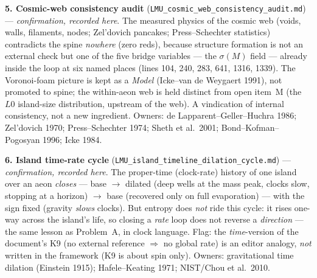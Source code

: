 \documentclass[11pt]{article}
\begin{document}
\smallskip\noindent\textbf{5. Cosmic-web consistency audit} (\texttt{LMU\_cosmic\_web\_consistency\_audit.md}) --- \emph{confirmation, recorded here}. The measured physics of the cosmic web (voids, walls, filaments, nodes; Zel'dovich pancakes; Press--Schechter statistics) contradicts the spine \emph{nowhere} (zero reds), because structure formation is not an external check but one of the five bridge variables --- the $\sigma(M)$ field --- already inside the loop at six named places (lines 104, 240, 283, 641, 1316, 1339). The Voronoi-foam picture is kept as a \emph{Model} (Icke--van de Weygaert 1991), not promoted to spine; the within-aeon web is held distinct from open item~M (the $L0$ island-size distribution, upstream of the web). A vindication of internal consistency, not a new ingredient. Owners: de Lapparent--Geller--Huchra 1986; Zel'dovich 1970; Press--Schechter 1974; Sheth et al.\ 2001; Bond--Kofman--Pogosyan 1996; Icke 1984.

\smallskip\noindent\textbf{6. Island time-rate cycle} (\texttt{LMU\_island\_timeline\_dilation\_cycle.md}) --- \emph{confirmation, recorded here}. The proper-time (clock-rate) history of one island over an aeon \emph{closes} --- base $\to$ dilated (deep wells at the mass peak, clocks slow, stopping at a horizon) $\to$ base (recovered only on full evaporation) --- with the sign fixed (gravity \emph{slows} clocks). But entropy does \emph{not} ride this cycle: it rises one-way across the island's life, so closing a \emph{rate} loop does not reverse a \emph{direction} --- the same lesson as Problem~A, in clock language. Flag: the \emph{time}-version of the document's K9 (no external reference $\Rightarrow$ no global rate) is an editor analogy, \emph{not} written in the framework (K9 is about spin only). Owners: gravitational time dilation (Einstein 1915); Hafele--Keating 1971; NIST/Chou et al.\ 2010.
\end{document}
